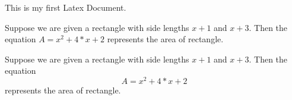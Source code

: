 \documentclass{article}
\begin{document}
This is my first Latex Document.

Suppose we are given a rectangle with side lengths $x+1$ and $x+3$. Then the equation $A= x^2+4*x+2$ represents the area of rectangle.


Suppose we are given a rectangle with side lengths $x+1$ and $x+3$. Then the equation $$A= x^2+4*x+2$$ represents the area of rectangle.
\end{document}
